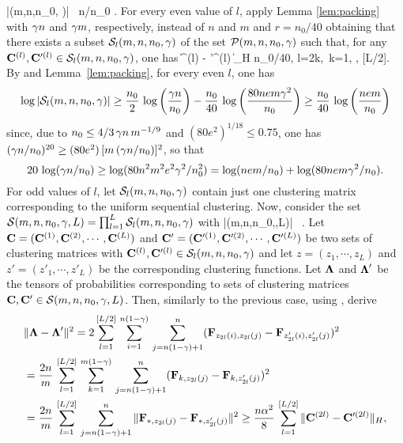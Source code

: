 \be \label{calF_card}
\log |\calP(m,n,n_0, \ga)| \geq {} \, \log \lkr \ga n/n_0  \rkr.
\ee
%
%
For every even value of $l$, apply Lemma \ref{lem:packing} with $\gamma n$ and $\gamma m$, 
respectively, instead of $n$ and $m$ and $r = n_0/40$ obtaining that there exists a 
subset ${\mathcal{S}}_l (m,n,n_0,\gamma)$ of the set ${\mathcal{P}}(m,n,n_0, \gamma)$ such that, for any 
$\mathbf{C}^{(l)}, \mathbf{C}'^{(l)} \in  {\mathcal{S}}_l (m,n,n_0,\gamma)$, one has 
\be \label{d_l}
  \| \bC^{(l)}  - \bC'^{(l)} \|_H   \geq  n_0/40, \quad  l=2k,\ k=1, \cdots, [L/2].
\ee 
By  and Lemma~\ref{lem:packing}, for every even $l$, one has 
\begin{align*}
\log |\calS_l (m,n,n_0,\ga)| \geq    \frac{n_0}{2}\, \log\lkr \frac{\ga n}{n_0}\rkr -   
\frac{n_0}{40}\, \log \lkr \frac{80 n e m \ga^2}{n_0}\rkr \geq \frac{n_0}{40}\,  \log \lkr \frac{n e m}{n_0}\rkr
\end{align*}
since, due to $n_0 \leq   4/3\, \gamma n\,m^{-1/9}$ and $(80 e^2)^{1/18} \leq 0.75$, one has 
$(\gamma n/n_0)^{20} \ge (80 e^2)\, [m\, (\gamma n /n_0)]^2$, so that 
$$
20\, \log(\gamma n/n_0) \ge  \log(80 n^2 m^2 e^2 \gamma^2/n_0^2) = \log(n e m/n_0) +
 \log (80 n e m \gamma^2/n_0). 
$$   
For odd values of $l$, let ${\mathcal{S}}_l (m,n,n_0,\gamma)$ contain just one clustering matrix corresponding to the 
uniform sequential clustering. 
%
%
Now, consider the set ${\mathcal{S}}  (m,n,n_0,\gamma,L) = \prod_{l=1}^{L} {\mathcal{S}}_l (m,n,n_0,\gamma)$ with   
\be  \label{cardSnmL}
\log|\calS  (m,n,n_0,\ga,L)| \geq  {}\, \log \lkr {}\rkr.
\ee 
Let $\mathbf{C} = (\mathbf{C}^{(1)}, \mathbf{C}^{(2)},\cdots,\mathbf{C}^{(L)})$ and $\mathbf{C}' = (\mathbf{C}'^{(1)}, \mathbf{C}'^{(2)},\cdots,\mathbf{C}'^{(L)})$  
be two sets of clustering matrices with $\mathbf{C}^{(l)}, \mathbf{C}'^{(l)} \in  {\mathcal{S}}_l (m,n,n_0,\gamma)$ and let $z = (z_1, \cdots, z_L)$ and 
 $z' = (z'_1, \cdots, z'_L)$  be the corresponding clustering functions.
Let $\bLam$ and $\bLam'$ be the tensors of probabilities 
corresponding to sets of clustering matrices $\mathbf{C}, \mathbf{C}' \in {\mathcal{S}}  (m,n,n_0,\gamma,L)$. 
%
Then, similarly to the previous case, using , derive
\begin{align*}
& \| \bLam - \bLam'\|^2 
  =   2 \sum_{l=1}^{[L/2]} \, \sum_{i=1}^{n(1-\ga)}\, \sum_{j = n(1-\ga)+1}^n (\bF_{z_{2l}(i),z_{2l}(j)} -  \bF_{z'_{2l}(i),z'_{2l}(j)})^2  \\
%
& =    \frac{2n}{m} \, \sum_{l=1}^{[L/2]} \, \sum_{k=1}^{m(1-\ga)}\, \sum_{j = n(1-\ga)+1}^n (\bF_{k,z_{2l}(j)} -  \bF_{k,z'_{2l}(j)})^2 \\
%
& =       \frac{2n}{m} \, \sum_{l=1}^{[L/2]} \,  \sum_{j = n(1-\ga)+1}^n \|\bF_{*,z_{2l}(j)} -  \bF_{*,z'_{2l} (j)}\|^2  
%
  \geq    \frac{n \al^2}{8} \, \sum_{l=1}^{[L/2]}   \|\bC^{(2l)} - \bC'^{(2l)}\|_H, 
\end{align*}
